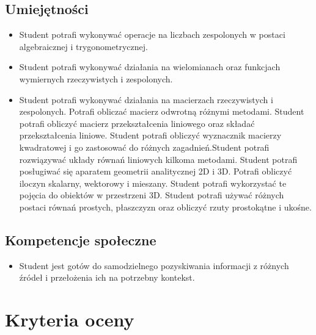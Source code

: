 \documentclass[12pt, a4paper]{article}
\begin{document}
\subsection*{Umiejętności}
\begin{itemize}
  \item Student potrafi wykonywać operacje na liczbach zespolonych w postaci algebraicznej i trygonometrycznej.
  \item Student potrafi wykonywać działania na wielomianach oraz funkcjach wymiernych rzeczywistych i zespolonych.
  \item Student potrafi wykonywać działania na macierzach rzeczywistych i zespolonych. Potrafi obliczać macierz odwrotną różnymi metodami. Student potrafi obliczyć macierz przekształcenia liniowego oraz składać przekształcenia liniowe. Student potrafi obliczyć wyznacznik macierzy kwadratowej i go zastosować do różnych zagadnień.Student potrafi rozwiązywać układy równań liniowych kilkoma metodami. Student potrafi  posługiwać się aparatem geometrii analitycznej 2D i 3D. Potrafi obliczyć iloczyn skalarny, wektorowy i mieszany. Student potrafi wykorzystać te pojęcia do obiektów w przestrzeni 3D. Student potrafi używać różnych postaci równań prostych, płaszczyzn oraz obliczyć rzuty prostokątne i ukośne.
\end{itemize}

\subsection*{Kompetencje społeczne}
\begin{itemize}
  \item Student jest gotów do samodzielnego pozyskiwania informacji z różnych źródeł i przełożenia ich na potrzebny kontekst.
\end{itemize}

\section{Kryteria oceny}
\end{document}
